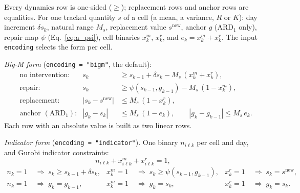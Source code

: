 \documentclass[11pt,a4paper]{article}
\theoremstyle{plain}
\theoremstyle{definition}
\newcommand{\ARDone}{\mathrm{ARD}_{1}}
\newcommand{\new}{\mathrm{new}}
\renewcommand{\_}{\textunderscore\allowbreak{}}
\begin{document}
Every dynamics row is one-sided ($\geq$); replacement rows and anchor rows are
equalities. For one tracked quantity $s$ of a cell (a mean, a variance, $R$ or $K$):
day increment $\delta s_k$, natural range $M_s$, replacement value $s^{\new}$, anchor
$g$ ($\ARDone$ only), repair map $\psi$ (Eq.~\eqref{eq:a_psi}), cell binaries $x^m_k$,
$x^r_k$, and $e_k = x^m_k + x^r_k$. The input \texttt{encoding} selects the form per
cell.

\emph{Big-M form} (\texttt{encoding = "bigm"}, the default):
\begin{align}
  &\text{no intervention:} & s_k &\geq s_{k-1} + \delta s_k - M_s\,(x^m_k + x^r_k),
    \label{eq:a_bigm_carry} \\
  &\text{repair:} & s_k &\geq \psi(s_{k-1}, g_{k-1}) - M_s\,(1 - x^m_k),
    \label{eq:a_bigm_repair} \\
  &\text{replacement:} & |s_k - s^{\new}| &\leq M_s\,(1 - x^r_k),
    \label{eq:a_bigm_repl} \\
  &\text{anchor } (\ARDone)\text{:} & |g_k - s_k| &\leq M_s\,(1 - e_k), \qquad
    |g_k - g_{k-1}| \leq M_s\, e_k .
    \label{eq:a_bigm_anchor}
\end{align}
Each row with an absolute value is built as two linear rows.

\emph{Indicator form} (\texttt{encoding = "indicator"}). One binary $n_{i\ell k}$ per
cell and day, and Gurobi indicator constraints:
\begin{equation}
  n_{i\ell k} + x^m_{i\ell k} + x^r_{i\ell k} = 1 ,
  \label{eq:a_ind_sum}
\end{equation}
\begin{align}
  n_k = 1 &\;\Rightarrow\; s_k \geq s_{k-1} + \delta s_k, &
  x^m_k = 1 &\;\Rightarrow\; s_k \geq \psi(s_{k-1}, g_{k-1}), &
  x^r_k = 1 &\;\Rightarrow\; s_k = s^{\new}, \label{eq:a_ind_state} \\
  n_k = 1 &\;\Rightarrow\; g_k = g_{k-1}, &
  x^m_k = 1 &\;\Rightarrow\; g_k = s_k, &
  x^r_k = 1 &\;\Rightarrow\; g_k = s_k. \label{eq:a_ind_anchor}
\end{align}
\end{document}
